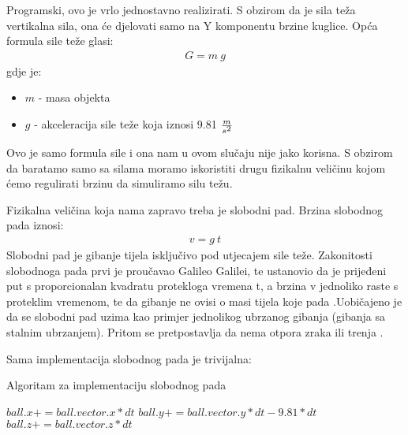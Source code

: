 Programski, ovo je vrlo jednostavno realizirati. S obzirom da je sila teža vertikalna sila, ona će djelovati samo na Y komponentu brzine kuglice. Opća formula sile teže glasi:
\begin{equation} \label{equ:sila_teza}
	\begin{aligned}
		G = m \ g
	\end{aligned}
\end{equation}
gdje je:
\begin{itemize}
	\item $m$ - masa objekta
	\item $g$ - akceleracija sile teže koja iznosi 9.81 $\frac{m}{s\textsuperscript{2}}$
\end{itemize}
Ovo je samo formula sile i ona nam u ovom slučaju nije jako korisna. S obzirom da baratamo samo sa silama moramo iskoristiti drugu fizikalnu veličinu kojom ćemo regulirati brzinu da simuliramo silu težu. 

Fizikalna veličina koja nama zapravo treba je slobodni pad. Brzina slobodnog pada iznosi:
\begin{equation}\label{slobodni_pad}
	\begin{aligned}
		v = g \ t
	\end{aligned}
\end{equation}
Slobodni pad je gibanje tijela isključivo pod utjecajem sile teže. Zakonitosti slobodnoga pada prvi je proučavao Galileo Galilei, te ustanovio da je prijeđeni put s proporcionalan kvadratu protekloga vremena t, a brzina v jednoliko raste s proteklim vremenom, te da gibanje ne ovisi o masi tijela koje pada \cite{10}.Uobičajeno je da se slobodni pad uzima kao primjer jednolikog ubrzanog gibanja (gibanja sa stalnim ubrzanjem). Pritom se pretpostavlja da nema otpora zraka ili trenja \cite{10}.

Sama implementacija slobodnog pada je trivijalna:
\begin{algorithm}
	\caption{Algoritam za implementaciju slobodnog pada}
	\label{alg:free_fall}
	\begin{algorithmic}
		\State $ball.x += ball.vector.x * dt$
		\State $ball.y += ball.vector.y * dt - 9.81 * dt$
		\State $ball.z += ball.vector.z * dt$
		\EndFunction
	\end{algorithmic}
\end{algorithm}

